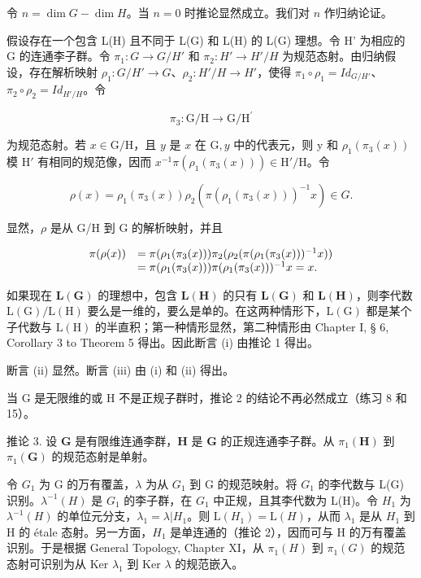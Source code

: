 令 \(n = \dim G - \dim H\)。当 \(n = 0\) 时推论显然成立。我们对 \(n\) 作归纳论证。

假设存在一个包含 L(H) 且不同于 L(G) 和 L(H) 的 L(G) 理想。令 H' 为相应的 G 的连通李子群。令 \(\pi_{1}: G \to G/H'\) 和 \(\pi_{2}: H' \to H'/H\) 为规范态射。由归纳假设，存在解析映射 \(\rho_{1}: G/H' \to G\)、\(\rho_{2}: H'/H \to H'\)，使得 \(\pi_{1} \circ \rho_{1} = Id_{G/H'}\)、\(\pi_{2} \circ \rho_{2} = Id_{H'/H}\)。令

\[
\pi_ {3} \colon \mathrm{G} / \mathrm{H} \rightarrow \mathrm{G} / \mathrm{H} ^ {\prime}
\]

为规范态射。若 \(x \in \mathrm{G} / \mathrm{H}\)，且 \(y\) 是 \(x\) 在 \(\mathrm{G}, y\) 中的代表元，则 y 和 \(\rho_1(\pi_3(x))\) 模 \(\mathrm{H}'\) 有相同的规范像，因而 \(x^{-1}\pi (\rho_1(\pi_3(x))) \in \mathrm{H}' / \mathrm{H}\)。令

\[
\rho (x) = \rho_ {1} (\pi_ {3} (x)) \rho_ {2} (\pi (\rho_ {1} (\pi_ {3} (x))) ^ {- 1} x) \in G.
\]

显然，\(\rho\) 是从 G/H 到 G 的解析映射，并且

\[
\begin{array}{r l} \pi (\rho (x)) & = \pi (\rho_ {1} (\pi_ {3} (x))) \pi_ {2} (\rho_ {2} (\pi (\rho_ {1} (\pi_ {3} (x))) ^ {- 1} x)) \\ & = \pi (\rho_ {1} (\pi_ {3} (x))) \pi (\rho_ {1} (\pi_ {3} (x))) ^ {- 1} x = x. \end{array}
\]

如果现在 \(\mathbf{L}(\mathbf{G})\) 的理想中，包含 \(\mathbf{L}(\mathbf{H})\) 的只有 \(\mathbf{L}(\mathbf{G})\) 和 \(\mathbf{L}(\mathbf{H})\)，则李代数 \(\mathrm{L(G) / L(H)}\) 要么是一维的，要么是单的。在这两种情形下，\(\mathrm{L(G)}\) 都是某个子代数与 \(\mathrm{L(H)}\) 的半直积；第一种情形显然，第二种情形由 Chapter I, § 6, Corollary 3 to Theorem 5 得出。因此断言 (i) 由推论 1 得出。

断言 (ii) 显然。断言 (iii) 由 (i) 和 (ii) 得出。

当 G 是无限维的或 H 不是正规子群时，推论 2 的结论不再必然成立（练习 8 和 15）。

推论 3. 设 \(\mathbf{G}\) 是有限维连通李群，\(\mathbf{H}\) 是 \(\mathbf{G}\) 的正规连通李子群。从 \(\pi_1(\mathbf{H})\) 到 \(\pi_1(\mathbf{G})\) 的规范态射是单射。

令 \(G_{1}\) 为 G 的万有覆盖，\(\lambda\) 为从 \(G_{1}\) 到 G 的规范映射。将 \(G_{1}\) 的李代数与 L(G) 识别。\(\lambda^{-1}(H)\) 是 \(G_{1}\) 的李子群，在 \(G_{1}\) 中正规，且其李代数为 L(H)。令 \(H_{1}\) 为 \(\lambda^{-1}(H)\) 的单位元分支，\(\lambda_{1} = \lambda | H_{1}\)。则 \(\mathrm{L}(H_{1}) = \mathrm{L}(H)\)，从而 \(\lambda_{1}\) 是从 \(H_{1}\) 到 H 的 étale 态射。另一方面，\(H_{1}\) 是单连通的（推论 2），因而可与 H 的万有覆盖识别。于是根据 General Topology, Chapter XI，从 \(\pi_{1}(H)\) 到 \(\pi_{1}(G)\) 的规范态射可识别为从 Ker \(\lambda_{1}\) 到 Ker \(\lambda\) 的规范嵌入。

